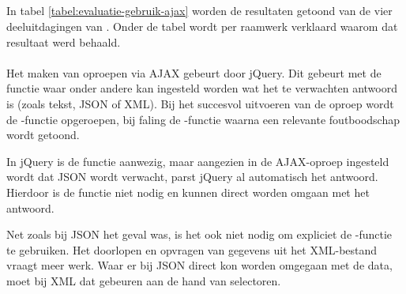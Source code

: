 
\subsection{}
\label{sec:evaluatie-gebruik-ajax}

In tabel \ref{tabel:evaluatie-gebruik-ajax} worden de resultaten getoond van de vier deeluitdagingen van .
Onder de tabel wordt per raamwerk verklaard waarom dat resultaat werd behaald.

\begin{table}[H]
\centering
{}
\caption{Gebruik voor }
\label{tabel:evaluatie-gebruik-ajax}
\end{table}


\paragraph{\jqm}
Het maken van oproepen via AJAX gebeurt door jQuery. 
Dit gebeurt met de functie  waar onder andere kan ingesteld worden wat het te verwachten antwoord is (zoals tekst, JSON of XML). 
Bij het succesvol uitvoeren van de oproep wordt de -functie opgeroepen, bij faling de -functie waarna een relevante foutboodschap wordt getoond.

In jQuery is de functie  aanwezig, maar aangezien in de AJAX-oproep ingesteld wordt dat JSON wordt verwacht, parst jQuery al automatisch het antwoord. 
Hierdoor is de functie  niet nodig en kunnen direct worden omgaan met het antwoord.

Net zoals bij JSON het geval was, is het ook niet nodig om expliciet de -functie te gebruiken. 
Het doorlopen en opvragen van gegevens uit het XML-bestand vraagt meer werk. 
Waar er bij JSON direct kon worden omgegaan met de data, moet bij XML dat gebeuren aan de hand van selectoren.

